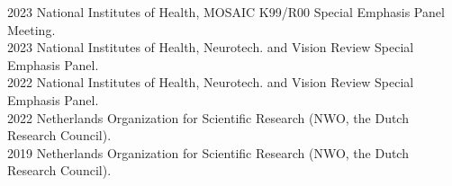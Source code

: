 2023 \hspace{58pt} National Institutes of Health, MOSAIC K99/R00 Special Emphasis Panel Meeting. \\
2023 \hspace{58pt} National Institutes of Health, Neurotech. and Vision Review Special Emphasis Panel. \\
2022 \hspace{58pt} National Institutes of Health, Neurotech. and Vision Review Special Emphasis Panel. \\
2022 \hspace{58pt} Netherlands Organization for Scientific Research (NWO, the Dutch Research Council). \\
2019 \hspace{58pt} Netherlands Organization for Scientific Research (NWO, the Dutch Research Council). \\
